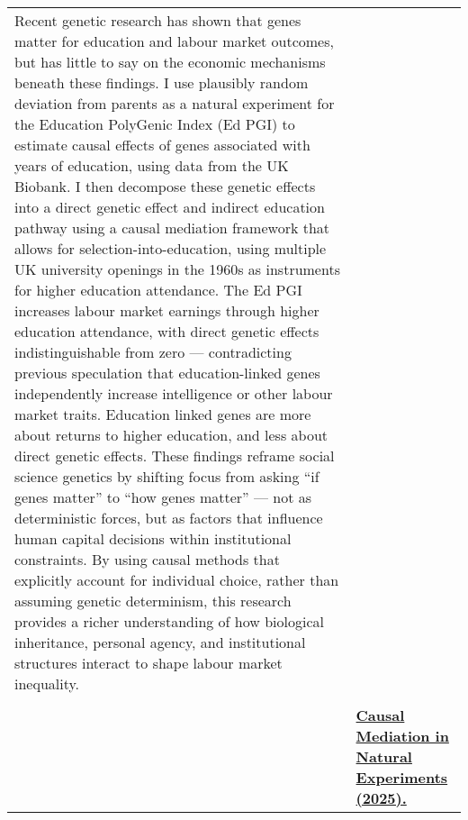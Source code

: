 \documentclass[letterpaper,11pt,oneside]{article}
\begin{document}
\begin{longtable}[\textwidth]{p{} p{}}
    Recent genetic research has shown that genes matter for education and labour market outcomes, but has little to say on the economic mechanisms beneath these findings.
    I use plausibly random deviation from parents as a natural experiment for the Education PolyGenic Index (Ed PGI) to estimate causal effects of genes associated with years of education, using data from the UK Biobank.
    I then decompose these genetic effects into a direct genetic effect and indirect education pathway using a causal mediation framework that allows for selection-into-education, using multiple UK university openings in the 1960s as instruments for higher education attendance. 
    The Ed PGI increases labour market earnings through higher education attendance, with direct genetic effects indistinguishable from zero --- contradicting previous speculation that education-linked genes independently increase intelligence or other labour market traits.
    Education linked genes are more about returns to higher education, and less about direct genetic effects.
    These findings reframe social science genetics by shifting focus from asking ``if genes matter'' to ``how genes matter'' --- not as deterministic forces, but as factors that influence human capital decisions within institutional constraints.
    By using causal methods that explicitly account for individual choice, rather than assuming genetic determinism, this research provides a richer understanding of how biological inheritance, personal agency, and institutional structures interact to shape labour market inequality. \\ \\

    & \textbf{\href{https://raw.githubusercontent.com/shoganhennessy/mediation-natural-experiment/main/mediation-natural-experiment-2025.pdf}{
        Causal Mediation in Natural Experiments (2025).}}


\end{longtable}
\end{document}
